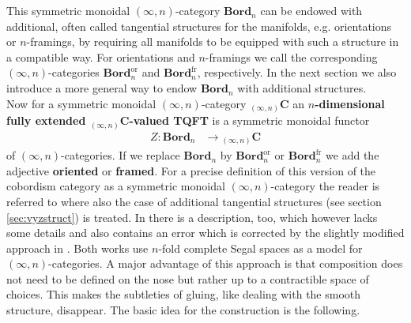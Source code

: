This symmetric monoidal $(\infty,n)$-category $\mathbf{Bord}_{n}$ can be endowed with additional, often called tangential structures for the manifolds, e.g. orientations or $n$-framings, by requiring all manifolds to be equipped with such a structure in a compatible way. For orientations and $n$-framings we call the corresponding $(\infty,n)$-categories $\mathbf{Bord}_{n}^{\mathrm{or}}$ and $\mathbf{Bord}_{n}^{\mathrm{fr}}$, respectively. In the next section we also introduce a more general way to endow $\mathbf{Bord}_{n}$ with additional structures.
\\
Now for a symmetric monoidal $(\infty,n)$-category ${_{(\infty,n)}}\mathbf{C}$ an \textbf{$n$-dimensional fully extended ${_{(\infty,n)}}\mathbf{C}$-valued TQFT} is a symmetric monoidal functor
\begin{align*}
  Z
  \colon
  \mathbf{Bord}_{n}
  &\to
  {_{(\infty,n)}}\mathbf{C}
\end{align*}
of $(\infty,n)$-categories. If we replace $\mathbf{Bord}_{n}$ by $\mathbf{Bord}_{n}^{\mathrm{or}}$ or $\mathbf{Bord}_{n}^{\mathrm{fr}}$ we add the adjective \textbf{oriented} or \textbf{framed}. For a precise definition of this version of the cobordism category as a symmetric monoidal $(\infty,n)$-category the reader is referred to \cite{29781dd2} where also the case of additional tangential structures (see section \ref{sec:vyzstruct}) is treated. In \cite{dfcdc48c} there is a description, too, which however lacks some details and also contains an error which is corrected by the slightly modified approach in \cite{29781dd2}. Both works use $n$-fold complete Segal spaces as a model for $(\infty,n)$-categories. A major advantage of this approach is that composition does not need to be defined on the nose but rather up to a contractible space of choices. This makes the subtleties of gluing, like dealing with the smooth structure, disappear. The basic idea for the construction is the following.
\\
